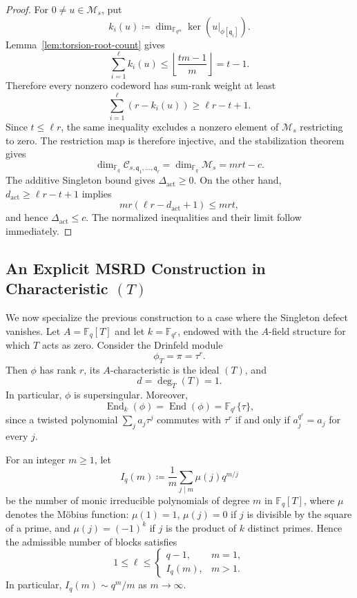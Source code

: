 \documentclass[10pt,a4paper]{amsart}
\DeclareMathOperator{\End}{End}
\theoremstyle{definition}
\theoremstyle{plain}
\theoremstyle{remark}
\newcommand{\vF}{\mathbb F}
\begin{document}
\begin{proof}
For $0\neq u\in\mathcal M_s$, put
$$
k_i(u)\coloneqq
\dim_{\vF_{q^m}}\ker\left(u|_{\phi[\mathfrak q_i]}\right).
$$
Lemma~\ref{lem:torsion-root-count} gives
$$
\sum_{i=1}^{\ell}k_i(u)
\leq
\left\lfloor\frac{tm-1}{m}\right\rfloor
=t-1.
$$
Therefore every nonzero codeword has sum-rank weight at least
$$
\sum_{i=1}^{\ell}(r-k_i(u))
\geq\ell r-t+1.
$$
Since $t\leq\ell r$, the same inequality excludes a nonzero element of
$\mathcal M_s$ restricting to zero. The restriction map is therefore
injective, and the stabilization theorem gives
$$
\dim_{\vF_q}\mathcal C_{s,\mathfrak q_1,\ldots,\mathfrak q_\ell}
=
\dim_{\vF_q}\mathcal M_s
=mrt-c.
$$
The additive Singleton bound gives $\Delta_{\mathrm{act}}\geq0$. On the
other hand, $d_{\mathrm{act}}\geq\ell r-t+1$ implies
$$
mr(\ell r-d_{\mathrm{act}}+1)\leq mrt,
$$
and hence $\Delta_{\mathrm{act}}\leq c$. The normalized inequalities and
their limit follow immediately.
\end{proof}

\subsection{An Explicit MSRD Construction in Characteristic
\texorpdfstring{$(T)$}{(T)}}

We now specialize the previous construction to a case where the Singleton
defect vanishes. Let $A=\vF_q[T]$ and let $k=\vF_{q^r}$, endowed with the
$A$-field structure for which $T$ acts as zero. Consider the Drinfeld module
$$
    \phi_T=\pi=\tau^r.
$$
Then $\phi$ has rank $r$, its $A$-characteristic is the ideal $(T)$, and
$$
    d=\deg_T(T)=1.
$$
In particular, $\phi$ is supersingular.
Moreover,
$$
    \End_k(\phi)=\End(\phi)=\vF_{q^r}\{\tau\},
$$
since a twisted polynomial $\sum_j a_j\tau^j$ commutes with $\tau^r$ if and
only if $a_j^{q^r}=a_j$ for every $j$.

For an integer $m\geq 1$, let
$$
I_q(m)
\coloneqq
\frac{1}{m}\sum_{j\mid m}\mu(j)q^{m/j}
$$
be the number of monic irreducible polynomials of degree $m$ in
$\vF_q[T]$, where $\mu$ denotes the Möbius function: $\mu(1)=1$, $\mu(j)=0$ if $j$ is
divisible by the square of a prime, and $\mu(j)=(-1)^k$ if $j$ is the
product of $k$ distinct primes. Hence the admissible
number of blocks satisfies
$$
1\leq\ell\leq
\begin{cases}
q-1, & m=1,\\
I_q(m), & m>1.
\end{cases}
$$
In particular, $I_q(m)\sim q^m/m$ as $m\to\infty$.
\end{document}
